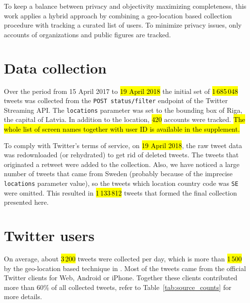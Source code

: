 \documentclass{IOS-Book-Article}
\begin{document}
To keep a balance between privacy and objectivity maximizing completeness, this work applies a hybrid approach by combining a geo-location based collection procedure with tracking a curated list of users. To minimize privacy issues, only accounts of organizations and public figures are tracked.



\section{Data collection}
\label{sec:data-collection}

Over the period from 15 April 2017 to \hl{19 April 2018} the initial set of \hl{1\,685\,048} tweets was collected from the \texttt{POST status/filter} endpoint of the Twitter Streaming API.\footnotemark{}
%
%
The \texttt{locations} parameter was set to the bounding box of Riga, the capital of Latvia.\footnotemark{}
%
%
In addition to the location, \hl{420} accounts were tracked. \hl{The whole list of screen names together with user ID is available in the supplement.}

To comply with Twitter's terms of service, on \hl{19 April 2018}, the raw tweet data was redownloaded (or rehydrated) to get rid of deleted tweets. The tweets that originated a retweet were added to the collection. Also, we have noticed a large number of tweets that came from Sweden (probably because of the imprecise \texttt{locations} parameter value), so the tweets which location country code was \texttt{SE} were omitted. This resulted in \hl{1\,133\,812} tweets that formed the final collection presented here.

\section{Twitter users}
\label{sec:global-analysis}



On average, about \hl{3\,200} tweets were collected per day, which is more than \hl{1\,500} by the geo-location based technique in \cite{milajevs:2017:BUCC}. Most of the tweets came from the official Twitter clients for Web, Android or iPhone. Together these clients contributed more than 60\% of all collected tweets, refer to Table~\ref{tab:source_counts} for more details.
\end{document}
